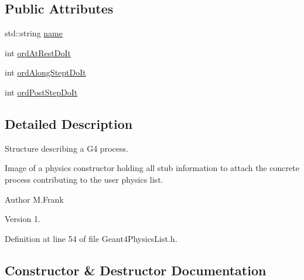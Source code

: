 \subsection*{Public Attributes}
\begin{DoxyCompactItemize}
\item 
std\+::string \hyperlink{class_d_d4hep_1_1_simulation_1_1_geant4_physics_list_1_1_process_a215e1b0b76f9da5783f191129c1abf0d}{name}
\item 
int \hyperlink{class_d_d4hep_1_1_simulation_1_1_geant4_physics_list_1_1_process_ab2954e7c39774a2eefc0891b8b5cf000}{ord\+At\+Rest\+Do\+It}
\item 
int \hyperlink{class_d_d4hep_1_1_simulation_1_1_geant4_physics_list_1_1_process_a392bb771bc353a55146a63793868fdd9}{ord\+Along\+Stept\+Do\+It}
\item 
int \hyperlink{class_d_d4hep_1_1_simulation_1_1_geant4_physics_list_1_1_process_a5c1ea6f1d3867ef4c1c0a74c7d16783b}{ord\+Post\+Step\+Do\+It}
\end{DoxyCompactItemize}


\subsection{Detailed Description}
Structure describing a G4 process. 

Image of a physics constructor holding all stub information to attach the concrete process contributing to the user physics list.

\begin{DoxyAuthor}{Author}
M.\+Frank 
\end{DoxyAuthor}
\begin{DoxyVersion}{Version}
1. 
\end{DoxyVersion}


Definition at line 54 of file Geant4\+Physics\+List.\+h.



\subsection{Constructor \& Destructor Documentation}
\hypertarget{class_d_d4hep_1_1_simulation_1_1_geant4_physics_list_1_1_process_ac8ddef52a1287d02acdb83b769ee8c94}{}\label{class_d_d4hep_1_1_simulation_1_1_geant4_physics_list_1_1_process_ac8ddef52a1287d02acdb83b769ee8c94} 
